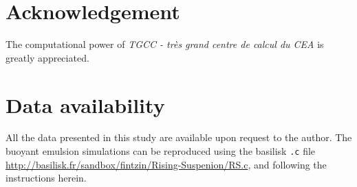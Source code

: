 \section*{Acknowledgement}

The computational power of  \textit{TGCC - tr\`es grand centre de calcul du CEA} is greatly appreciated. 
\section*{Data availability}

All the data presented in this study are available upon request to the author. 
The buoyant emulsion simulations can be reproduced using the basilisk \texttt{.c} file \url{http://basilisk.fr/sandbox/fintzin/Rising-Suspenion/RS.c}, and following the instructions herein. 
